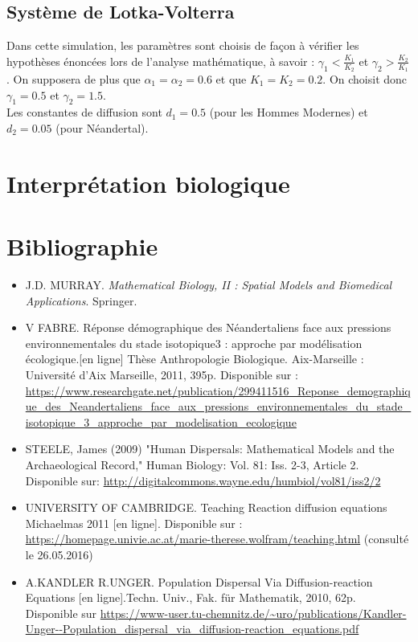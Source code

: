 \documentclass[a4paper,11pt]{article}
\begin{document}
\subsection{Système de Lotka-Volterra}

Dans cette simulation, les paramètres sont choisis de façon à vérifier les hypothèses énoncées lors de l'analyse mathématique, à savoir : $\gamma_1 < \frac{K_1}{K_2}$ et $\gamma_2 > \frac{K_2}{K_1}$. On supposera de plus que $\alpha_1 = \alpha_2 = 0.6$ et que $K_1 = K_2 = 0.2$. On choisit donc $\gamma_1 = 0.5$ et $\gamma_2 = 1.5$.\\
Les constantes de diffusion sont $d_1 = 0.5$ (pour les Hommes Modernes) et $d_2 = 0.05$ (pour Néandertal).\\


\section{Interprétation biologique}
\section{Bibliographie}
\begin{itemize}
    \item J.D. MURRAY. \textit{Mathematical Biology, II : Spatial Models and Biomedical Applications}. Springer.
	\item V FABRE. Réponse démographique des Néandertaliens face aux pressions environnementales du stade isotopique3 : approche par modélisation écologique.[en ligne] Thèse Anthropologie Biologique. Aix-Marseille : Université d'Aix Marseille, 2011, 395p. Disponible sur : \url{ https://www.researchgate.net/publication/299411516_Reponse_demographique_des_Neandertaliens_face_aux_pressions_environnementales_du_stade_isotopique_3_approche_par_modelisation_ecologique}
	\item STEELE, James (2009) "Human Dispersals: Mathematical Models and the Archaeological Record," Human Biology: Vol. 81: Iss. 2-3, Article 2. Disponible sur: \url{http://digitalcommons.wayne.edu/humbiol/vol81/iss2/2}
    \item UNIVERSITY OF CAMBRIDGE. Teaching Reaction diffusion equations Michaelmas  2011 [en ligne]. Disponible sur : \url{https://homepage.univie.ac.at/marie-therese.wolfram/teaching.html} (consulté le 26.05.2016)
    \item A.KANDLER R.UNGER. Population Dispersal Via Diffusion-reaction Equations [en ligne].Techn. Univ., Fak. für Mathematik, 2010, 62p. Disponible sur \url{https://www-user.tu-chemnitz.de/~uro/publications/Kandler-Unger--Population_dispersal_via_diffusion-reaction_equations.pdf}
\end{itemize}
\end{document}
